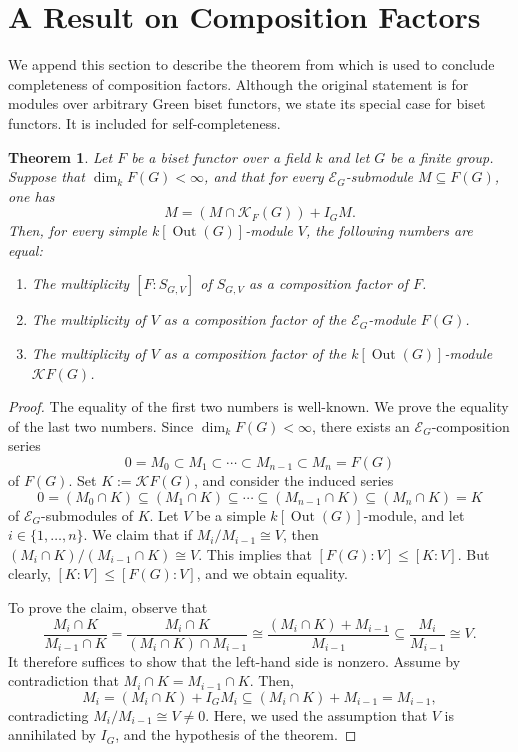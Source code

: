 \documentclass[12pt]{article}
\theoremstyle{plain}
\newtheorem{theorem}{Theorem}[section]
\theoremstyle{definition}
\newcommand{\out}{\operatorname{Out}}
\begin{document}
\section{A Result on Composition Factors}

We append this section to describe the theorem from \cite{BCK} which is used to conclude completeness of composition factors. Although the original statement is for modules over arbitrary Green biset functors, we state its special case for biset functors. It is included for self-completeness. 

\begin{theorem}
Let \( F \) be a biset functor over a field \( k \) and let \( G \) be a finite group. Suppose that \( \dim_k F(G) < \infty \), and that for every \( \mathcal E_G \)-submodule \( M \subseteq F(G) \), one has
\[
M = (M \cap \mathcal K_F(G)) + I_G M.
\]
Then, for every simple \( k[\out(G)]\)-module \( V \), 
the following numbers are equal:
\begin{enumerate}
    \item The multiplicity $[F : S_{G,V}]$ of $S_{G, V}$ as a composition factor of $F$.
    \item The multiplicity of $V$ as a composition factor of the $\mathcal E_G$-module $F(G)$.
    \item The multiplicity of $V$ as a composition factor of the $k[\out(G)]$-module $\mathcal KF(G)$.
\end{enumerate}
\end{theorem}

\begin{proof} The equality of the first two numbers is well-known. We prove the equality of the last two numbers.
Since \( \dim_k F(G) < \infty \), there exists an \( \mathcal E_G \)-composition series
\[
0 = M_0 \subset M_1 \subset \cdots \subset M_{n-1} \subset M_n = F(G)
\]
of \( F(G) \). Set \( K := \mathcal KF(G) \), and consider the induced series
\[
0 = (M_0 \cap K) \subseteq (M_1 \cap K) \subseteq \cdots \subseteq (M_{n-1} \cap K) \subseteq (M_n \cap K) = K
\]
of \( \mathcal E_G \)-submodules of \( K \). Let \( V \) be a simple \( k[\out(G)]\)-module, and let \( i \in \{1, \ldots, n\} \). We claim that if \( M_i / M_{i-1} \cong V \), then \( (M_i \cap K)/(M_{i-1} \cap K) \cong V \). This implies that \( [F(G) : V] \leq [K : V] \). But clearly, \( [K : V] \leq [F(G) : V] \), and we obtain equality. 

To prove the claim, observe that
\[
\frac{M_i \cap K}{M_{i-1} \cap K} = \frac{M_i \cap K}{(M_i \cap K) \cap M_{i-1}} \cong \frac{(M_i \cap K) + M_{i-1}}{M_{i-1}} \subseteq \frac{M_i}{M_{i-1}} \cong V.
\]
It therefore suffices to show that the left-hand side is nonzero. Assume by contradiction that \( M_i \cap K = M_{i-1} \cap K \). Then,
\[
M_i = (M_i \cap K) + I_G M_i \subseteq (M_i \cap K) + M_{i-1} = M_{i-1},
\]
contradicting \( M_i / M_{i-1} \cong V \neq 0 \). Here, we used the assumption that \( V \) is annihilated by \( I_G \), and the hypothesis of the theorem.
\end{proof}
\end{document}
